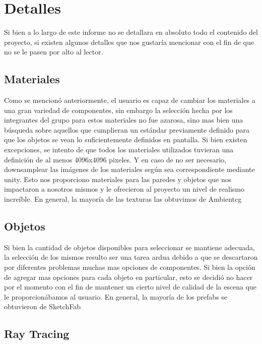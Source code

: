 \section{Detalles}

Si bien a lo largo de este informe no se detallara en absoluto todo el contenido del proyecto, si existen algunos detalles que nos gustaría mencionar con el fin de que no se le pasen por alto al lector.

\subsection{Materiales}

Como se mencionó anteriormente, el usuario es capaz de cambiar los materiales a una gran variedad de componentes, sin embargo la selección hecha por los integrantes del grupo para estos materiales no fue azarosa, sino mas bien una búsqueda sobre aquellos que cumplieran un estándar previamente definido para que los objetos se vean lo suficientemente definidos en pantalla. Si bien existen excepciones, se intento de que todos los materiales utilizados tuvieran una definición de al menos 4096x4096 pixeles. Y en caso de no ser necesario, downsamplear las imágenes de los materiales según sea correspondiente mediante unity. Esto nos proporciono materiales para las paredes y objetos que nos impactaron a nosotros mismos y le ofrecieron al proyecto un nivel de realismo increíble. En general, la mayoría de las texturas las obtuvimos de Ambientcg \cite{ambientcg}

\subsection{Objetos}

Si bien la cantidad de objetos disponibles para seleccionar se mantiene adecuada, la selección de los mismos resulto ser una tarea ardua debido a que se descartaron por diferentes problemas muchas mas opciones de componentes. Si bien la opción de agregar mas opciones para cada objeto en particular, esto se decidió no hacer por el momento con el fin de mantener un cierto nivel de calidad de la escena que le proporcionábamos al usuario. En general, la mayoría de los prefabs se obtuvieron de SketchFab\cite{sketchfab}

\subsection{Ray Tracing}


